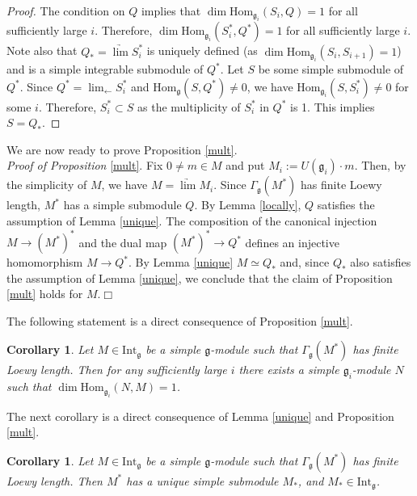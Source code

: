 \documentclass{birkmult}
\newcounter{theorem}
\newtheorem{corollary}[theo]{Corollary}
\renewcommand{\gg}{\mathfrak{g}}
\newcommand{\refle}[1]{Lemma \ref{#1}}
\newcommand{\refprop}[1]{Proposition \ref{#1}}
\newcommand{\ds}{\displaystyle}
\newcommand{\Int}{\mathrm{Int}}
\renewcommand{\hom}{\mathrm{Hom}}
\begin{document}
\begin{proof} The condition on $Q$ implies
that $\dim\hom_{\gg_i}(S_i,Q)=1$ for all sufficiently large $i$.
Therefore, $\dim\hom_{\gg_i}(S^*_i,Q^*)=1$ for all sufficiently
large $i$. Note also that $Q_*=\underrightarrow{\lim} S^*_i$ is
uniquely defined (as $\dim\hom_{\gg_i}(S_i,S_{i+1})=1$) and is a
simple integrable submodule of $Q^*$. Let $S$ be some simple submodule of
$Q^*$. Since $\ds Q^*=\lim_{\gets}S_i^*$ and
$\hom_{\gg}(S,Q^*)\neq 0$, we have $\hom_{\gg_i}(S,S_i^*)\neq 0$
for some $i$. Therefore, $S_i^*\subset S$ as the multiplicity of
$S^*_i$ in $Q^*$ is 1. This implies $S=Q_*$.
\end{proof}

We are now ready to prove \refprop{mult}. \\{\it Proof of Proposition} \ref{mult}. Fix $0\neq m\in M$ and put $M_i:=U(\gg_i)\cdot
m$. Then, by the simplicity of $M$, we have
$M=\underrightarrow{\lim} M_i$. Since $\Gamma_\gg(M^*)$ has finite
Loewy length, $M^*$ has a simple submodule $Q$. By
\refle{locally}, $Q$ satisfies the assumption of \refle{unique}.
The composition of the canonical injection $M\to (M^*)^*$ and the
dual map $(M^*)^*\to Q^*$ defines an injective homomorphism $M\to Q^*$. By
\refle{unique} $M\simeq Q_*$ and, since $Q_*$ also satisfies the assumption
of Lemma \ref{unique}, we conclude that the claim of Proposition
\ref{mult} holds for $M$.$\Box$

The following statement is a direct consequence of Proposition \ref{mult}.

\begin{corollary}\label{ffin}Let $M\in\Int_\gg$ be a simple $\gg$-module such that $\Gamma_{\gg}(M^*)$
  has finite Loewy length. Then for any sufficiently large $i$
  there exists a simple $\gg_i$-module $N$ such that $\dim\hom_{\gg_i}
  (N,M)=1$.
\end{corollary}
The next corollary is a direct consequence of \refle{unique} and Proposition \ref{mult}.

\begin{corollary}\label{simplesoc}Let $M\in\Int_\gg$ be a simple $\gg$-module such that $\Gamma_{\gg}(M^*)$
  has finite Loewy length. Then $M^*$ has a unique simple submodule $M_*$, and $M_*\in\Int_\gg$.
\end{corollary}
\end{document}
